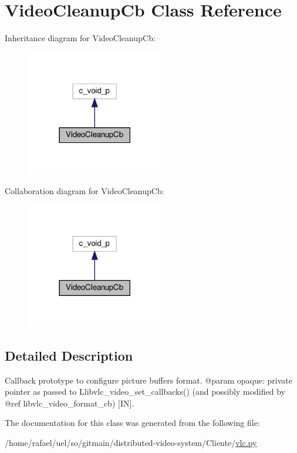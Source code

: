 \hypertarget{classvlc_1_1_video_cleanup_cb}{}\section{Video\+Cleanup\+Cb Class Reference}
\label{classvlc_1_1_video_cleanup_cb}


Inheritance diagram for Video\+Cleanup\+Cb\+:
\nopagebreak
\begin{figure}[H]
\begin{center}
\leavevmode
\includegraphics[width=170pt]{classvlc_1_1_video_cleanup_cb__inherit__graph}
\end{center}
\end{figure}


Collaboration diagram for Video\+Cleanup\+Cb\+:
\nopagebreak
\begin{figure}[H]
\begin{center}
\leavevmode
\includegraphics[width=170pt]{classvlc_1_1_video_cleanup_cb__coll__graph}
\end{center}
\end{figure}


\subsection{Detailed Description}
\begin{DoxyVerb}Callback prototype to configure picture buffers format.
@param opaque: private pointer as passed to L{libvlc_video_set_callbacks}() (and possibly modified by @ref libvlc_video_format_cb) [IN].
\end{DoxyVerb}
 

The documentation for this class was generated from the following file\+:\begin{DoxyCompactItemize}
\item 
/home/rafael/uel/so/gitmain/distributed-\/video-\/system/\+Cliente/\hyperlink{vlc_8py}{vlc.\+py}\end{DoxyCompactItemize}
